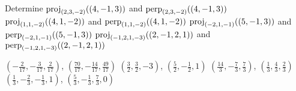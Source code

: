 
\begin{Exercise}[
name={},
title={}, 
difficulty=0,
origin={\cite{SM}}]
Determine
\Question $\proj{(4,-1,3)}{(2,3,-2)}$ and $\orth{(4,-1,3)}{(2,3,-2)}$
\Question $\proj{(4,1,-2)}{(1,1,-2)}$ and $\orth{(4,1,-2)}{(1,1,-2)}$
\Question $\proj{(5,-1,3)}{(-2,1,-1)}$ and $\orth{(5,-1,3)}{(-2,1,-1)}$
\Question $\proj{(2,-1,2,1)}{(-1,2,1,-3)}$ and\\ $\orth{(2,-1,2,1)}{(-1,2,1,-3)}$
\end{Exercise}

\begin{Answer}
\Question $\left(-\frac{2}{17},-\frac{3}{17},\frac{2}{17}\right)$, $\left(\frac{70}{17},-\frac{14}{17},\frac{49}{17}\right)$
\Question $\left(\frac{3}{2},\frac{3}{2},-3\right)$, $\left(\frac{5}{2},-\frac{1}{2},1\right)$
\Question $\left(\frac{14}{3},-\frac{7}{3},\frac{7}{3}\right)$, $\left(\frac{1}{3},\frac{4}{3},\frac{2}{3}\right)$
\Question $\left(\frac{1}{3},-\frac{2}{3},-\frac{1}{3},1\right)$, $\left(\frac{5}{3},-\frac{1}{3},\frac{7}{3},0\right)$
\end{Answer}
